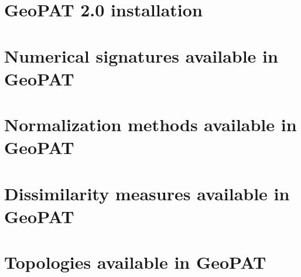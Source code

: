 \documentclass[a4paper, 11pt]{book}
\begin{document}
\FloatBarrier

\begin{appendices}

\chapter{GeoPAT 2.0 installation}


\chapter{Numerical signatures available in GeoPAT \label{signatures}} 


\chapter{Normalization methods available in GeoPAT \label{normalization}} 


\chapter{Dissimilarity measures available in GeoPAT \label{measures}}


\chapter{Topologies available in GeoPAT \label{topology}}


\end{appendices}

\newpage

\printbibliography[heading=bibintoc,title={References}]
\end{document}
